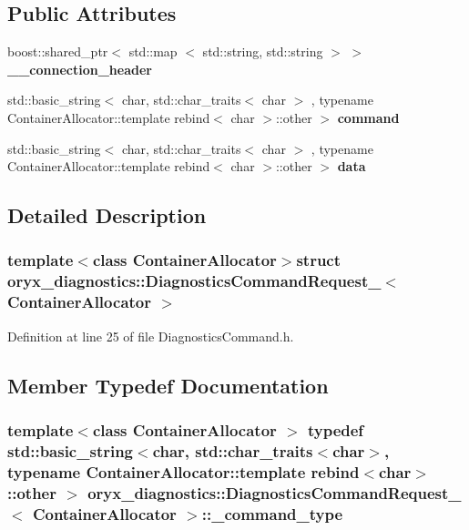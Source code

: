 \subsection*{\-Public \-Attributes}
\begin{DoxyCompactItemize}
\item 
boost\-::shared\-\_\-ptr$<$ std\-::map\*
$<$ std\-::string, std\-::string $>$ $>$ {\bf \-\_\-\-\_\-connection\-\_\-header}
\item 
std\-::basic\-\_\-string$<$ char, \*
std\-::char\-\_\-traits$<$ char $>$\*
, typename \*
\-Container\-Allocator\-::template \*
rebind$<$ char $>$\-::other $>$ {\bf command}
\item 
std\-::basic\-\_\-string$<$ char, \*
std\-::char\-\_\-traits$<$ char $>$\*
, typename \*
\-Container\-Allocator\-::template \*
rebind$<$ char $>$\-::other $>$ {\bf data}
\end{DoxyCompactItemize}


\subsection{\-Detailed \-Description}
\subsubsection*{template$<$class Container\-Allocator$>$struct oryx\-\_\-diagnostics\-::\-Diagnostics\-Command\-Request\-\_\-$<$ Container\-Allocator $>$}



\-Definition at line 25 of file \-Diagnostics\-Command.\-h.



\subsection{\-Member \-Typedef \-Documentation}
\subsubsection[{\-\_\-command\-\_\-type}]{\setlength{\rightskip}{0pt plus 5cm}template$<$class Container\-Allocator $>$ typedef std\-::basic\-\_\-string$<$char, std\-::char\-\_\-traits$<$char$>$, typename \-Container\-Allocator\-::template rebind$<$char$>$\-::other $>$ {\bf oryx\-\_\-diagnostics\-::\-Diagnostics\-Command\-Request\-\_\-}$<$ \-Container\-Allocator $>$\-::{\bf \-\_\-command\-\_\-type}}\label{structoryx__diagnostics_1_1DiagnosticsCommandRequest___aaa7caf39209daaae4c274c8e2c211239}


